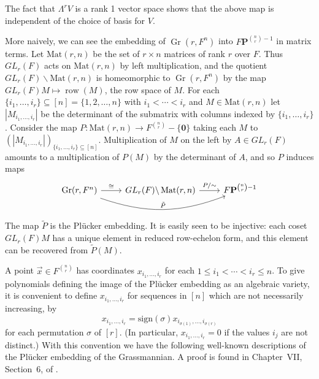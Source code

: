 \documentclass[10pt, preprint]{article}
\theoremstyle{definition}
\begin{document}
The fact that $\Lambda ^{r} V$ is a rank 1 vector space shows that the
above map is independent of the choice of basis for $V$.

More naively, we can see the embedding of $\operatorname{Gr}(r, F^{n})$
into $F\mathbf{P}^{\binom{n}{r}-1}$ in matrix terms. Let $
\mathrm{Mat}(r,n)$ be the set of $r\times n$ matrices of rank $r$ over
$F$. Thus $GL_{r}(F)$ acts on $\mathrm{Mat}(r,n)$ by left
multiplication, and the quotient $GL_{r}(F)\backslash \mathrm{Mat}(r,n)$
is homeomorphic to $\operatorname{Gr}(r, F^{n})$ by the map
$GL_{r}(F)M \mapsto \mathop{\mathrm{row}}(M)$, the row space of $M$. For each
$\{i_{1},\ldots , i_{r}\}\subseteq [n] =\{1,2, \dots , n\}$ with
$i_{1}<\cdots <i_{r}$ and $M\in \mathrm{Mat}(r,n)$ let $|M_{i_{1},
\ldots , i_{r}}|$ be the determinant of the submatrix with columns
indexed by $\{i_{1},\ldots , i_{r}\}$. Consider the map $P:
\mathrm{Mat}(r,n)\to F^{\binom{n}{r}}-\{\mathbf{0}\}$ taking each
$M$ to $(|M_{i_{1}, \ldots , i_{r}}|)_{\{i_{1},\ldots , i_{r}\}\subseteq
[n]}$. Multiplication of $M$ on the left by $A\in GL_{r}(F)$ amounts to
a multiplication of $P(M)$ by the determinant of $A$, and so $P$ induces
maps
%
\begin{equation*}
%
\begin{tikzcd}
\operatorname{Gr} (r, F^n)\arrow[r,"\cong "]\arrow[rr, bend right=20, "\tilde P"]&
GL_r(F)\backslash \operatorname{Mat}(r,n)\arrow[r,"P/\sim "] &
F\mathbf P^{{n\choose r}-1}
\end{tikzcd}
%
\end{equation*}
%
The map $\tilde{P}$ is the Pl\"{u}cker embedding. It is easily seen to
be injective: each coset $GL_{r}(F)M$ has a unique element in reduced
row-echelon form, and this element can be recovered from $\tilde{P}(M)$.

A point $\vec{x}\in F^{\binom{n}{r}}$ has coordinates $x_{i_{1},
\ldots , i_{r}}$ for each $1\leq i_{1}<\cdots <i_{r}\leq n$. To give
polynomials defining the image of the Pl\"{u}cker embedding as an
algebraic variety, it is convenient to define $x_{i_{1}, \ldots , i
_{r}}$ for sequences in $[n]$ which are not necessarily increasing, by\vspace*{-1pt}
%
\begin{equation*}
x_{i_{1}, \ldots , i_{r}}=\mathrm{sign}(\sigma )x_{i_{\sigma (1)},
\ldots , i_{\sigma (r)}}
\end{equation*}
%
for each permutation $\sigma $ of $[r]$. (In particular, $x_{i_{1},
\ldots , i_{r}}=0$ if the values $i_{j}$ are not distinct.) With this
convention we have the following well-known descriptions of the
Pl\"{u}cker embedding of the Grassmannian. A proof is found in
Chapter~VII, Section~6, of \cite{Hodge-Pedoe}.
\end{document}
